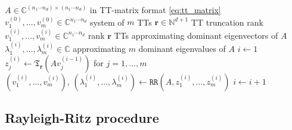 \documentclass[10pt,preprint]{elsarticle}
\begin{document}
\begin{algorithm}
\caption{Subspace iteration with rank truncation}
\label{alg:subspace_low_rank}
\begin{algorithmic}[1]
\Require
\Statex \hspace{1em} 
$A \in \mathbb{C}^{(n_1 \cdots n_d) \times (n_1 \cdots n_d)}$ in TT-matrix format \eqref{eq:tt_matrix}
\Statex \hspace{1em} $v_1^{(0)}, \ldots, v_m^{(0)} \in \mathbb{C}^{n_1 \cdots n_d}$ system of $m$ TTs 
\Statex \hspace{1em} $\bm r \in \mathbb{N}^{d+1}$ TT truncation rank
\Ensure
\Statex \hspace{1em} 
$v_1^{(i)}, \ldots, v_m^{(i)} \in \mathbb{C}^{n_1 \cdots n_d}$ rank $\bm r$ TTs approximating dominant eigenvectors of $A$ 
\Statex \hspace{1em} 
$\lambda_1^{(i)}, \ldots, \lambda_m^{(i)} \in \mathbb{C}$ approximating $m$ dominant eigenvalues of $A$
\vspace{0.5em}
\State $i \gets 1$
    \State $z_j^{(i)} \gets \mathfrak{T}_{\bm r}\!\left(A v_j^{(i-1)} \right)$ 
           \quad for $j = 1,\ldots,m$
    \State $(v_1^{(i)}, \ldots, v_m^{(i)}), \, (\lambda_1^{(i)}, \ldots, \lambda_m^{(i)}) 
           \gets \texttt{RR}(A, z_1^{(i)}, \ldots, z_m^{(i)})$
    \State $i \gets i+1$
\EndWhile
\end{algorithmic}
\end{algorithm}


\subsection{Rayleigh-Ritz procedure} 
\label{sec:RR}
\end{document}
